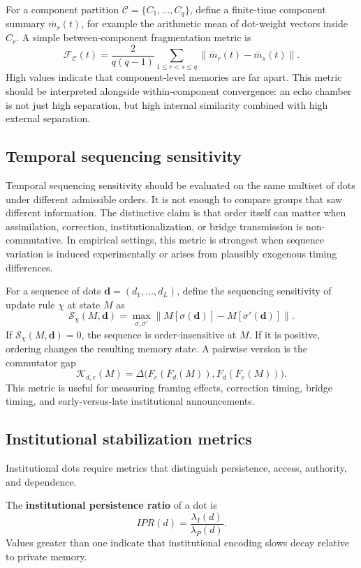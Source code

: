 \documentclass[11pt]{article}
\theoremstyle{remark}
\begin{document}
For a component partition $\mathcal{C}=\{C_1,\ldots,C_q\}$, define a
finite-time component summary $\bar m_r(t)$, for example the arithmetic
mean of dot-weight vectors inside $C_r$. A simple between-component
fragmentation metric is
$$
\mathcal{F}_{\mathcal{C}}(t)
=
\frac{2}{q(q-1)}\sum_{1\leq r<s\leq q}
\|\bar m_r(t)-\bar m_s(t)\|.
$$
High values indicate that component-level memories are far apart. This
metric should be interpreted alongside within-component convergence: an
echo chamber is not just high separation, but high internal similarity
combined with high external separation.

\subsection{Temporal sequencing sensitivity}\label{temporal-sequencing-sensitivity}

Temporal sequencing sensitivity should be evaluated on the same multiset of dots under different admissible orders. It is not enough to compare groups that saw different information. The distinctive claim is that order itself can matter when assimilation, correction, institutionalization, or bridge transmission is non-commutative. In empirical settings, this metric is strongest when sequence variation is induced experimentally or arises from plausibly exogenous timing differences.


For a sequence of dots $\mathbf d=(d_1,\ldots,d_L)$, define the
sequencing sensitivity of update rule $\chi$ at state $M$ as
$$
\mathcal{S}_\chi(M,\mathbf d)
=
\max_{\sigma,\sigma'}
\left\|M[\sigma(\mathbf d)]-M[\sigma'(\mathbf d)]\right\|.
$$
If $\mathcal{S}_\chi(M,\mathbf d)=0$, the sequence is order-insensitive
at $M$. If it is positive, ordering changes the resulting memory state.
A pairwise version is the commutator gap
$$
\mathcal{K}_{d,e}(M)
=
\Delta\big(F_e(F_d(M)),F_d(F_e(M))\big).
$$
This metric is useful for measuring framing effects, correction timing,
bridge timing, and early-versus-late institutional announcements.

\subsection{Institutional stabilization metrics}\label{institutional-stabilization-metrics}

Institutional dots require metrics that distinguish persistence, access,
authority, and dependence.

The \textbf{institutional persistence ratio} of a dot is
$$
IPR(d)=\frac{\lambda_I(d)}{\lambda_P(d)}.
$$
Values greater than one indicate that institutional encoding slows decay
relative to private memory.
\end{document}
